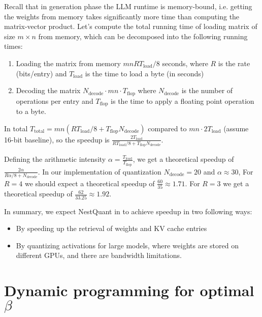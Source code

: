 Recall that in generation phase the LLM runtime is memory-bound, i.e. getting the weights from memory takes significantly more time than computing the matrix-vector product. Let's compute the total running time of loading matrix of size $m \times n$ from memory, which can be decomposed into the following running times:

\begin{enumerate}
    \item Loading the matrix from memory $mnR T_{\mathrm{load}}/8$ seconds, where $R$ is the rate (bits/entry) and $T_{\mathrm{load}}$ is the time to load a byte (in seconds)
    \item Decoding the matrix $N_{\mathrm{decode}}\cdot mn\cdot T_{\mathrm{flop}}$ where $N_{\mathrm{decode}}$ is the number of operations per entry and $T_{\mathrm{flop}}$ is the time to apply a floating point operation to a byte.
\end{enumerate}

In total $T_{\mathrm{total}}=mn(R T_{\mathrm{load}}/8+T_{\mathrm{flop}}N_{\mathrm{decode}})$
compared to $mn \cdot 2T_{\mathrm{load}}$ (assume 16-bit baseline), so the speedup is $\frac{2T_{\mathrm{load}}}{RT_{\mathrm{load}}/8+T_{\mathrm{flop}}N_{\mathrm{decode}}}$. 

Defining the arithmetic intensity $\alpha = \frac{T_{\mathrm{load}}}{T_{\mathrm{flop}}}$, we get a theoretical speedup of $\frac{2\alpha}{R\alpha/8+N_{\mathrm{decode}}}$. In our implementation of quantization $N_{\mathrm{decode}}=20$ and $\alpha\approx 30$, For $R=4$  we should expect a theoretical speedup of $\frac{60}{35}\approx 1.71$. For $R=3$  we get a theoretical speedup of $\frac{62}{33.25} \approx 1.92$.

In summary, we expect NestQuant in to achieve speedup in two following ways:

\begin{itemize}
    \item By speeding up the retrieval of weights and KV cache entries
    \item By quantizing activations for large models, where weights are stored on different GPUs, and there are bandwidth limitations.
\end{itemize}

\section{Dynamic programming for optimal $\beta$}

\label{dp-section}

